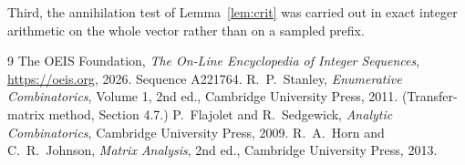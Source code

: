 \documentclass[11pt,a4paper]{article}
\theoremstyle{plain}
\theoremstyle{definition}
\begin{document}
Third, the annihilation test of Lemma~\ref{lem:crit} was carried out in exact integer
arithmetic on the whole vector rather than on a sampled prefix.

\begin{thebibliography}{9}
 The OEIS Foundation, \emph{The On-Line Encyclopedia of Integer
Sequences}, \url{https://oeis.org}, 2026. Sequence A221764.
 R.~P.~Stanley, \emph{Enumerative Combinatorics}, Volume 1, 2nd ed.,
Cambridge University Press, 2011. (Transfer-matrix method, Section 4.7.)
 P.~Flajolet and R.~Sedgewick, \emph{Analytic Combinatorics}, Cambridge
University Press, 2009.
 R.~A.~Horn and C.~R.~Johnson, \emph{Matrix Analysis}, 2nd ed., Cambridge
University Press, 2013.
\end{thebibliography}
\end{document}
